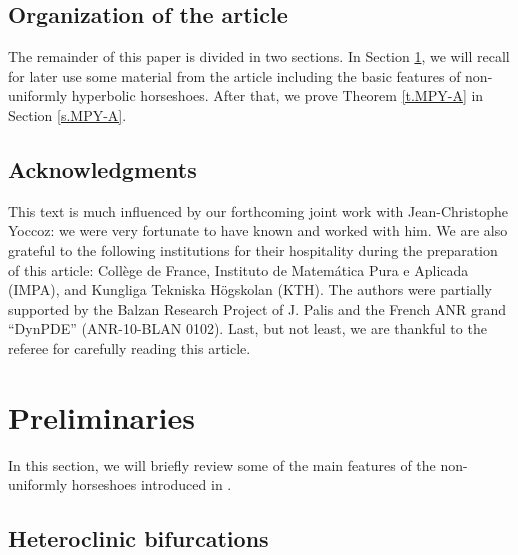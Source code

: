 \documentclass[12pt]{amsart}
\numberwithin{equation}{section}
\theoremstyle{definition}
\newtheorem{remark}[theorem]{Remark}
\newcommand{\<}{{\langle}}
\renewcommand{\>}{{\rangle}}
\begin{document}

\subsection{Organization of the article} The remainder of this paper is divided in two sections. In Section \ref{s.preliminaries}, we will recall for later use some material from the article \cite{PY09} including the basic features of non-uniformly hyperbolic horseshoes. After that, we prove Theorem \ref{t.MPY-A} in Section \ref{s.MPY-A}.   

\subsection*{Acknowledgments} This text is much influenced by our forthcoming joint work \cite{MPY} with Jean-Christophe Yoccoz: we were very fortunate to have known and worked with him. We are also grateful to the following institutions for their hospitality during the preparation of this article: Coll\`ege de France, Instituto de Matem\'atica Pura e Aplicada (IMPA), and Kungliga Tekniska H\"ogskolan (KTH). The authors were partially supported by the Balzan Research Project of J. Palis and the French ANR grand ``DynPDE'' (ANR-10-BLAN 0102). Last, but not least, we are thankful to the referee for carefully reading this article.  

\section{Preliminaries}\label{s.preliminaries}

In this section, we will briefly review some of the main features of the non-uniformly horseshoes introduced in \cite{PY09}. 

\subsection{Heteroclinic bifurcations}
\end{document}
